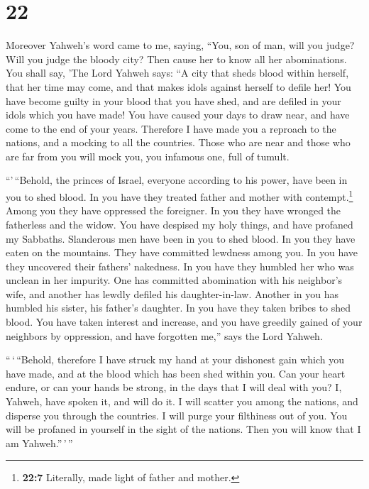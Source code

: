\hypertarget{section-20}{%
\section{22}\label{section-20}}

 Moreover Yahweh's word came to me, saying, 
``You, son of man, will you judge? Will you judge the bloody city? Then
cause her to know all her abominations.  You shall say,
'The Lord Yahweh says: ``A city that sheds blood within herself, that
her time may come, and that makes idols against herself to defile her!
 You have become guilty in your blood that you have shed,
and are defiled in your idols which you have made! You have caused your
days to draw near, and have come to the end of your years. Therefore I
have made you a reproach to the nations, and a mocking to all the
countries.  Those who are near and those who are far from
you will mock you, you infamous one, full of tumult.

 ``'\,``Behold, the princes of Israel, everyone according
to his power, have been in you to shed blood.  In you have
they treated father and mother with contempt.\footnote{\textbf{22:7}
  Literally, made light of father and mother.} Among you they have
oppressed the foreigner. In you they have wronged the fatherless and the
widow.  You have despised my holy things, and have
profaned my Sabbaths.  Slanderous men have been in you to
shed blood. In you they have eaten on the mountains. They have committed
lewdness among you.  In you have they uncovered their
fathers' nakedness. In you have they humbled her who was unclean in her
impurity.  One has committed abomination with his
neighbor's wife, and another has lewdly defiled his daughter-in-law.
Another in you has humbled his sister, his father's daughter.
 In you have they taken bribes to shed blood. You have
taken interest and increase, and you have greedily gained of your
neighbors by oppression, and have forgotten me,'' says the Lord Yahweh.

 ``\,`\,``Behold, therefore I have struck my hand at your
dishonest gain which you have made, and at the blood which has been shed
within you.  Can your heart endure, or can your hands be
strong, in the days that I will deal with you? I, Yahweh, have spoken
it, and will do it.  I will scatter you among the
nations, and disperse you through the countries. I will purge your
filthiness out of you.  You will be profaned in yourself
in the sight of the nations. Then you will know that I am
Yahweh.''\,'\,''

